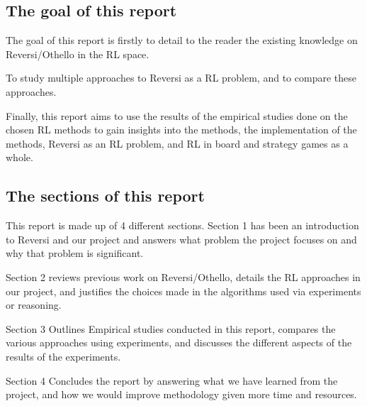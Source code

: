 \documentclass[../report.tex]{subfiles}
\begin{document}
\subsection{The goal of this report}
\label{The goal of this report}


The goal of this report is firstly to detail to the reader the existing knowledge on Reversi/Othello in the RL space.


To study multiple approaches to Reversi as a RL problem, and to compare these approaches.


Finally, this report aims to use the results of the empirical studies done on the chosen RL methods to gain insights into the methods,
the implementation of the methods, Reversi as an RL problem, and RL in board and strategy games as a whole.


\subsection{The sections of this report}
\label{The sections of this report}


This report is made up of 4 different sections.
Section 1 has been an introduction to Reversi and our project and answers what problem the project focuses on and why that problem is significant.


Section 2 reviews previous work on Reversi/Othello, details the RL approaches in our project, and justifies the choices made in the algorithms used via experiments or reasoning.


Section 3 Outlines Empirical studies conducted in this report, compares the various approaches using experiments, and discusses the different aspects of the results of the experiments.


Section 4 Concludes the report by answering what we have learned from the project, and how we would improve methodology given more time and resources.
\end{document}
